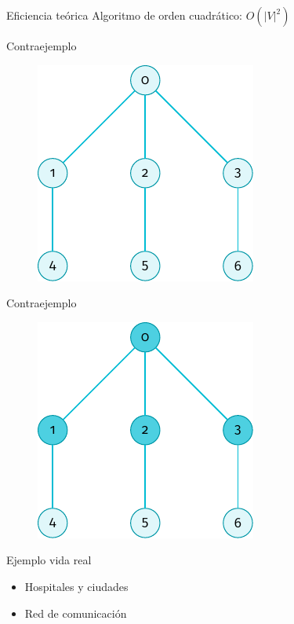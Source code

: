 \documentclass[spanish]{beamer}
\begin{document}
\begin{frame}{Eficiencia teórica}
	Algoritmo de orden cuadrático: $O(|V|^2)$
	
	
\end{frame}

\begin{frame}{Contraejemplo}

	\begin{figure}[H]
		\centering \includegraphics{./img/grafo2.pdf}
	\end{figure}
\end{frame}

\begin{frame}{Contraejemplo}

	\begin{figure}[H]
		\centering \includegraphics{./img/grafo2-no-minimal.pdf}
	\end{figure}	
\end{frame}

\begin{frame}{Ejemplo vida real}
	\begin{itemize}
		\item Hospitales y ciudades
		\item Red de comunicación
	\end{itemize}
\end{frame}
\end{document}
